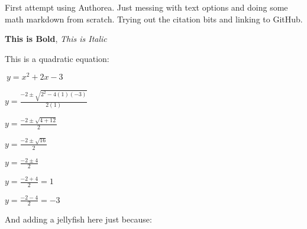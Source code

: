 First attempt using Authorea. Just messing with text options and doing some math markdown from scratch. Trying out the citation bits and linking to GitHub.

\textbf{This is Bold}, \textit{This is Italic}

This is a quadratic equation:

$\ y = x^{2} + 2x -3 $


$ y = \frac{-2 \pm \sqrt{2^{2}-4(1)(-3)}}{2(1)}$

$ y = \frac{-2 \pm \sqrt{4+12}}{2}$

$ y = \frac{-2 \pm \sqrt{16}}{2}$

$ y = \frac{-2 \pm {4}}{2}$

$ y = \frac{-2 + {4}}{2} = 1$

$ y = \frac{-2 - {4}}{2} = -3$


And adding a jellyfish here just because:

    
    
    
    
    
    
    
    
    
    